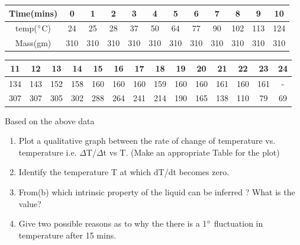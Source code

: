 \begin{enumerate}
\begin{center}
\begin{tabular}{ |c|c|c|c|c|c|c|c|c|c|c|c|} 
 \hline
 Time(mins) & 0 &1 &2 &3 &4 &5 &6 &7 &8 &9 &10 \\ 
 \hline
 temp($\degree$C) &24 &25 &28 &37 &50 &64 &77 &90 &102 &113 &124\\ 
 \hline
 Mass(gm)&310 &310 &310 &310 &310 &310 &310 &310 &310 &310 &310\\
 \hline
\end{tabular}
\end{center}

\begin{center}
\begin{tabular}{ |c|c|c|c|c|c|c|c|c|c|c|c|c|c| } 
 \hline
 11& 12& 13 &14 &15 &16 &17 &18 &19 &20 &21 &22 &23 &24 \\
 \hline
 134 &143 &152 &158 &160 &160 &160 &159 &160 &160 &161 &160 &161 &- \\
 \hline
 307 &307 &305 &302 &288 &264 &241 &214 &190 &165 &138 &110 &79 &69\\
 \hline
\end{tabular}
\end{center}
Based on the above data
\begin{enumerate}
    \item Plot a qualitative graph between the rate of change of temperature vs. temperature i.e. $\Delta$T/$\Delta$t vs T. (Make an appropriate Table for the plot)
    
    \item Identify the temperature T at which dT/dt becomes zero. 
    
    \item From(b) which intrinsic property of the liquid can be inferred ? What is the value? 
    
    \item Give two possible reasons as to why the there is a 1$\degree$ fluctuation in temperature after 15 mins.
    

\end{enumerate}
\end{enumerate}
